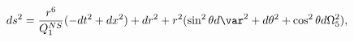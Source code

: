 \begin{equation}
ds^2 = \frac{r^6}{Q_1^{NS}}(-dt^2 + dx^2) + dr^2 + r^2(\sin^2\theta
d\var^2 + d\theta^2 + \cos^2\theta d\Omega_5^2),
\end{equation}

